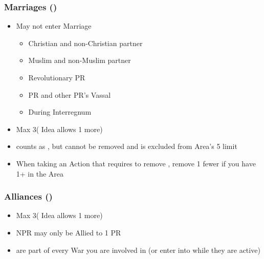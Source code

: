 \documentclass[10pt]{article}
\begin{document}
\subsubsection*{Marriages (\marriage)}
\begin{itemize}
	\item May not enter Marriage
	\begin{itemize}
		\item Christian and non-Christian partner
		\item Muslim and non-Muslim partner
		\item Revolutionary PR
		\item PR and other PR's Vassal
		\item During Interregnum
	\end{itemize}
	\item Max 3\marriages ( Idea allows 1 more)
	\item \marriage counts as \influence, but cannot be removed and is excluded from Area's 5 \influence limit
	\item When taking an Action that requires to remove \influence, remove 1 fewer \influence if you have 1+ \marriages in the Area
\end{itemize}

\subsubsection*{Alliances (\ally)}
\begin{itemize}
	\item Max 3\alliances ( Idea allows 1 more)
	\item NPR may only be Allied to 1 PR
	\item \activeallies are part of every War you are involved in (or enter into while they are active)
\end{itemize}
\end{document}

